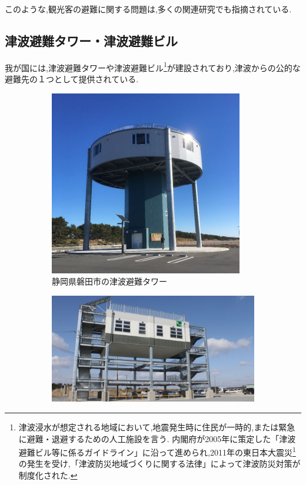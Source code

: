 このような,観光客の避難に関する問題は,多くの関連研究でも指摘されている.

\subsection{津波避難タワー・津波避難ビル}
我が国には,津波避難タワーや津波避難ビル\footnote{津波浸水が想定される地域において,地震発生時に住民が一時的,または緊急に避難・退避するための人工施設を言う.
内閣府が2005年に策定した「津波避難ビル等に係るガイドライン」に沿って進められ,2011年の東日本大震災\footnote{2011年3月11日14時46分頃に三陸沖の宮城県牡鹿半島の東南東130km付近を震源とする我が国最大規模の地震災害.}の発生を受け,「津波防災地域づくりに関する法律」によって津波防災対策が制度化された.}が建設されており,津波からの公的な避難先の１つとして提供されている.
\begin{figure}[H]
  \centering
  \begin{subfigure}{0.45\textwidth}
      \centering
      \includegraphics[width=\textwidth]{Figures/ShizuokaTunami-Tower.png}
      \caption{静岡県磐田市の津波避難タワー}
      \label{fig:image1}
  \end{subfigure}
  \begin{subfigure}{0.5\textwidth}
      \centering
      \includegraphics[width=\textwidth]{Figures/Isinomaki-TunamiBuild.png}

\end{subfigure}
\end{figure}
